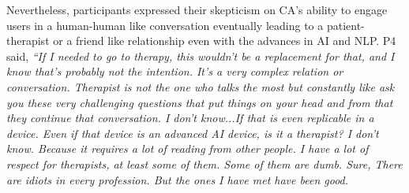         Nevertheless, participants expressed their skepticism on \ac{CA}'s ability to engage users in a human-human like conversation eventually leading to a patient-therapist or a friend like relationship even with the advances in \ac{AI} and \ac{NLP}. P4 said,
                \textit{``If I needed to go to therapy, this wouldn't be a replacement for that, and I know that's probably not the intention. 
                It's a  very complex  relation or conversation. Therapist is not the one who talks the most but constantly like ask you these very challenging questions that put things on your head and from that they continue that conversation. I don't know...If that is even replicable in a device. Even if that  device is an advanced \ac{AI} device, is it a therapist? I don't know. Because it requires a lot of reading from other people. I have a lot of respect for therapists, at least some of them. Some of them are dumb. Sure, There are  idiots in every profession. But the ones I have met have been good. 
                }
